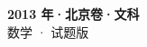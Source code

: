 \documentclass[zihao=-4, a4paper]{ctexart}
\begin{document}
\begin{center}
  {\Large\bfseries 2013 年·北京卷·文科}\\[4pt]
  {\large 数学 · 试题版}
\end{center}
\medskip
{}

\end{document}

